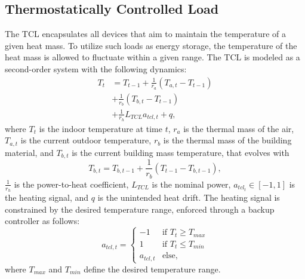 \subsection{Thermostatically Controlled Load}\label{ssec:tcl}
The TCL encapsulates all devices that aim to maintain the temperature of a given heat mass. To utilize such loads as energy storage, the temperature of the heat mass is allowed to fluctuate within a given range. The TCL is modeled as a second-order system \cite{Sonderegger.1978} with the following dynamics:
\begin{equation}
    \begin{split}
        T_t &= T_{t-1} + \frac{1}{r_a} (T_{a, t} - T_{t-1}) \\
        &+ \frac{1}{r_b} (T_{b,t} - T_{t-1}) \\
        &+ \frac{1}{r_h} L_{TCL} a_{tcl,t} + q,
    \end{split}
\end{equation}
where $T_t$ is the indoor temperature at time $t$, $r_a$ is the thermal mass of the air, $T_{a, t}$ is the current outdoor temperature, $r_b$ is the thermal mass of the building material, and $T_{b, t}$ is the current building mass temperature, that evolves with
\begin{equation}
    T_{b, t} = T_{b, t-1} + \frac{1}{r_b} (T_{t-1} - T_{b, t-1}),
\end{equation}
$\frac{1}{r_h}$ is the power-to-heat coefficient, $L_{TCL}$ is the nominal power, 
$a_{tcl_t} \in [-1, 1]$ is the heating signal, and $q$ is the unintended heat drift. The heating signal is constrained by the desired temperature range, enforced through a backup controller as follows:
\begin{equation}
    a_{tcl, t} = \begin{cases}
        -1 & \text{if } T_t \geq T_{max} \\
        1 & \text{if } T_t \leq T_{min} \\
        a_{tcl, t} & \text{else,} 
    \end{cases}
\end{equation}
where $T_{max}$ and $T_{min}$ define the desired temperature range. 

